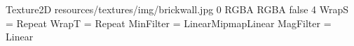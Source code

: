 Texture2D
resources/textures/img/brickwall.jpg
0
RGBA
RGBA
false
4
WrapS = Repeat
WrapT = Repeat
MinFilter = LinearMipmapLinear
MagFilter = Linear
